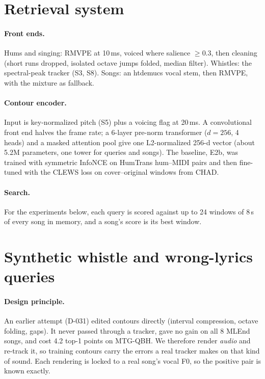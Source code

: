 \documentclass[11pt]{article}
\begin{document}
\section{Retrieval system}\label{sec:system}

\paragraph{Front ends.} Hums and singing: RMVPE at 10\,ms, voiced where salience $\ge 0.3$, then cleaning (short runs dropped, isolated octave jumps folded, median filter). Whistles: the spectral-peak tracker (S3, S8). Songs: an htdemucs \citep{defossez2021hybrid} vocal stem, then RMVPE, with the mixture as fallback.

\paragraph{Contour encoder.} Input is key-normalized pitch (S5) plus a voicing flag at 20\,ms. A convolutional front end halves the frame rate; a 6-layer pre-norm transformer ($d{=}256$, 4 heads) and a masked attention pool give one L2-normalized 256-d vector (about 5.2M parameters, one tower for queries and songs). The baseline, E2b, was trained with symmetric InfoNCE on HumTrans hum--MIDI pairs and then fine-tuned with the CLEWS loss on cover--original windows from CHAD.

\paragraph{Search.} For the experiments below, each query is scored against up to 24 windows of 8\,s of every song in memory, and a song's score is its best window.

\section{Synthetic whistle and wrong-lyrics queries}\label{sec:gen}

\paragraph{Design principle.} An earlier attempt (D-031) edited contours directly (interval compression, octave folding, gaps). It never passed through a tracker, gave no gain on all 8 MLEnd songs, and cost 4.2 top-1 points on MTG-QBH. We therefore render \emph{audio} and re-track it, so training contours carry the errors a real tracker makes on that kind of sound. Each rendering is locked to a real song's vocal F0, so the positive pair is known exactly.
\end{document}
